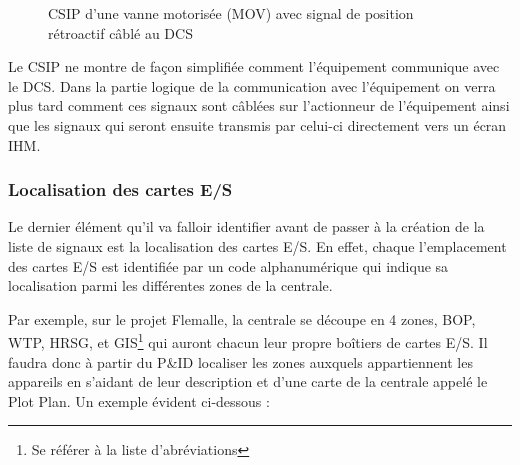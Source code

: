 \documentclass[11pt, openright]{book}
\begin{document}
\begin{figure}[ht!]
    \caption{CSIP d'une vanne motorisée (MOV) avec signal de position rétroactif câblé au DCS}
    \label{fig:CSIP}
\end{figure}


Le CSIP ne montre de façon simplifiée comment l'équipement communique avec le DCS. Dans la partie logique de la communication avec l'équipement on verra plus tard comment ces signaux sont câblées sur l'actionneur de l'équipement ainsi que les signaux qui seront ensuite transmis par celui-ci directement vers un écran IHM.

\subsubsection{Localisation des cartes E/S}
\label{sec:Localisation}

Le dernier élément qu'il va falloir identifier avant de passer à la création de la liste de signaux est la localisation des cartes E/S. En effet, chaque l'emplacement des cartes E/S est identifiée par un code alphanumérique qui indique sa localisation parmi les différentes zones de la centrale.

Par exemple, sur le projet Flemalle, la centrale se découpe en 4 zones, BOP, WTP, HRSG, et GIS\footnote{Se référer à la liste d'abréviations} qui auront chacun leur propre boîtiers de cartes E/S. Il faudra donc à partir du P\&ID localiser les zones auxquels appartiennent les appareils en s'aidant de leur description et d'une carte de la centrale appelé le Plot Plan. Un exemple évident ci-dessous :
\end{document}
